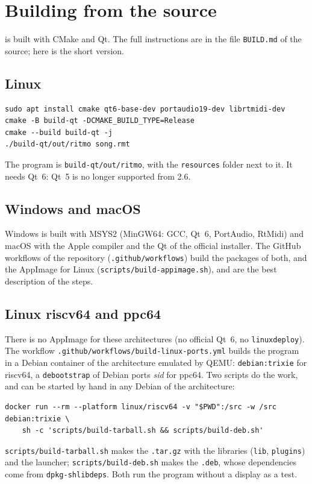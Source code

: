 \chapter{Building from the source}\label{app:building}

\RITMO{} is built with CMake and Qt. The full instructions are in the file \texttt{BUILD.md} of the source; here is the short version.

\section{Linux}

\begin{lstlisting}
sudo apt install cmake qt6-base-dev portaudio19-dev librtmidi-dev
cmake -B build-qt -DCMAKE_BUILD_TYPE=Release
cmake --build build-qt -j
./build-qt/out/ritmo song.rmt
\end{lstlisting}

The program is \texttt{build-qt/out/ritmo}, with the \texttt{resources} folder next to it. It needs Qt~6: Qt~5 is no longer
supported from 2.6.

\section{Windows and macOS}

Windows is built with MSYS2 (MinGW64: GCC, Qt~6, PortAudio, RtMidi) and macOS with the Apple compiler and the Qt of the official installer. The
GitHub workflows of the repository (\texttt{.github/workflows}) build the packages of both, and the AppImage for Linux
(\texttt{scripts/build-appimage.sh}), and are the best description of the steps.

\section{Linux riscv64 and ppc64}

There is no AppImage for these architectures (no official Qt~6, no \texttt{linuxdeploy}). The workflow
\texttt{.github/workflows/build-linux-ports.yml} builds the program in a Debian container of the architecture emulated by QEMU:
\texttt{debian:trixie} for riscv64, a \texttt{debootstrap} of Debian ports \emph{sid} for ppc64. Two scripts do the work, and can be
started by hand in any Debian of the architecture:
\begin{lstlisting}
docker run --rm --platform linux/riscv64 -v "$PWD":/src -w /src debian:trixie \
    sh -c 'scripts/build-tarball.sh && scripts/build-deb.sh'
\end{lstlisting}
\texttt{scripts/build-tarball.sh} makes the \texttt{.tar.gz} with the libraries (\texttt{lib}, \texttt{plugins}) and the launcher;
\texttt{scripts/build-deb.sh} makes the \texttt{.deb}, whose dependencies come from \texttt{dpkg-shlibdeps}. Both run the program
without a display as a test.

